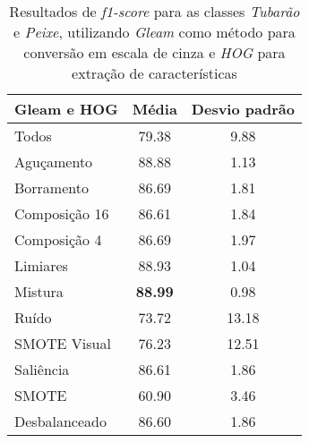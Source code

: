 \begin{itemize}
\begin{table}[!htbp]
\centering
\caption{Resultados de \textit{f1-score} para as classes \emph{Tubarão} e \emph{Peixe}, utilizando \emph{Gleam} como método para conversão em escala de cinza e \emph{HOG} para extração de características}
\label{tab:resultados:5:melhor}
\begin{tabular}{|l|c|c|}
\hline
\textbf{Gleam e HOG} & \textbf{Média} & \textbf{Desvio padrão} \\ \hline
Todos                & 79.38          & 9.88                   \\ \hline
Aguçamento           & 88.88          & 1.13                   \\ \hline
Borramento           & 86.69          & 1.81                   \\ \hline
Composição 16        & 86.61          & 1.84                   \\ \hline
Composição 4         & 86.69          & 1.97                   \\ \hline
Limiares             & 88.93          & 1.04                   \\ \hline
Mistura              & \textbf{88.99} & 0.98                   \\ \hline
Ruído                & 73.72          & 13.18                  \\ \hline
SMOTE Visual         & 76.23          & 12.51                  \\ \hline
Saliência            & 86.61          & 1.86                   \\ \hline
SMOTE                & 60.90          & 3.46                   \\ \hline
Desbalanceado        & 86.60          & 1.86                   \\ \hline
\end{tabular}
\end{table}

\end{itemize}


